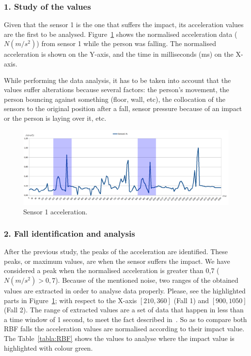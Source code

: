 \documentclass[journal]{IEEEtran}
\begin{document}
\subsubsection*{1. Study of the values} Given that the sensor 1 is the one that suffers the
impact, its acceleration values are the first to be analysed. Figure~\ref{fig:Sensor1Sombras} 
shows the normalised acceleration data ($N(m/s^2)$) from sensor 1 while the person was falling. The normalised acceleration is
shown on the Y-axis, and the 
time in milliseconds (ms) on the X-axis.

While performing the data analysis, it has to be taken into account that the values suffer 
alterations because several factors: the person's movement, the person bouncing against something 
(floor, wall, etc), the collocation of the sensors to the original position after a fall, 
sensor pressure because of an impact or the person is laying over it, etc.

 \begin{figure}[!ht]
  \includegraphics[scale=0.19]{img/Sensor1Sombras}
  \caption[Sensor 1 acceleration]{Sensor 1 acceleration.}
  \label{fig:Sensor1Sombras}
\end{figure}

\subsubsection*{2. Fall identification and analysis} After the previous study, the peaks of the acceleration are identified. 
These peaks, or maximum values, are when the sensor suffers the impact. We have considered a peak when the normalised acceleration is 
greater than 0,7 ($N(m/s^2) > 0,7$). Because of the mentioned noise, two ranges of the obtained 
values are extracted in order to analyse data properly. Please, see the highlighted parts in Figure~\ref{fig:Sensor1Sombras};
with respect to the X-axis $[210, 360]$ (Fall 1) and $[900, 1050]$ (Fall 2). The range of extracted values are a set of data that 
happen in less than a time window of 1 second, to meet the fact described in~\cite{Luder2009}. So as to compare both RBF falls
the acceleration values are normalised according to their impact value. The Table~\ref{tabla:RBF} 
shows the values to analyse where the impact value is highlighted with colour green.
\end{document}
